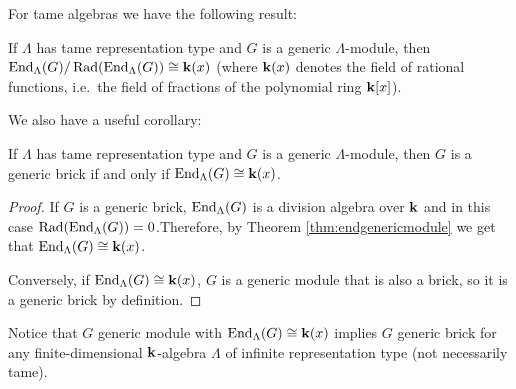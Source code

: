 For tame algebras we have the following result:
\begin{theorem}\label{thm:endgenericmodule}
	If $\Lambda$ has tame representation type and $G$ is a generic $\Lambda$-module, then $\operatorname{End}_\Lambda(G)/\operatorname{Rad}(\operatorname{End}_\Lambda(G)) \cong \mathbf{k}(x)$ (where $\mathbf{k}(x)$ denotes the field of rational functions, i.e.~the field of fractions of the polynomial ring $\mathbf{k}[x]$).
\end{theorem}
We also have a useful corollary:
\begin{corollary}
	If $\Lambda$ has tame representation type and $G$ is a generic $\Lambda$-module, then $G$ is a generic brick if and only if $\operatorname{End}_\Lambda(G)\cong \mathbf{k}(x)$.
\end{corollary}
\begin{proof}
	If $G$ is a generic brick, $\operatorname{End}_\Lambda(G)$ is a division algebra over $\mathbf{k}$ and in this case $\operatorname{Rad}(\operatorname{End}_\Lambda(G))=0$.Therefore, by Theorem \ref{thm:endgenericmodule} we get that $\operatorname{End}_\Lambda(G)\cong \mathbf{k}(x)$.
	
	Conversely, if $\operatorname{End}_\Lambda(G)\cong \mathbf{k}(x)$, $G$ is a generic module  that is also a brick, so it is a generic brick by definition.
\end{proof}

\begin{remark}\label{rem:genmodulek(x)}
	Notice that $G$ generic module with $\operatorname{End}_\Lambda(G)\cong \mathbf{k}(x)$ implies $G$ generic brick for any finite-dimensional $\mathbf{k}$-algebra $\Lambda$ of infinite representation type (not necessarily tame).
\end{remark}





